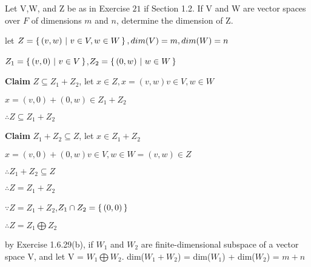 Let V,W, and Z be as in Exercise $21$ if Section 1.2. If V and W are vector spaces over $F$ of dimensions $m$ and $n$, determine the dimension of Z.

\begin{tcolorbox}
	\begin{solution}
		let $Z = \left\{ \,(v,w) ~|~ v \in V,w \in W \,\right\}, dim(V)=m,dim(W)=n$
		
		$Z_1 = \left\{ \,(v,0) ~|~ v \in V \,\right\}$,$Z_2 = \left\{ \,(0,w) ~|~ w \in W \,\right\}$
		
		\textbf{Claim} $Z \subseteq Z_1 + Z_2$, let $x \in Z, x = (v,w) v\in V,w \in W$
		
		$x = (v,0) + (0,w) \in Z_1 + Z_2$
		
		$\therefore Z \subseteq Z_1 + Z_2$
		
		\textbf{Claim} $Z_1 + Z_2 \subseteq Z$, let $x \in Z_1 + Z_2$
		
		$x = (v,0) + (0,w) v\in V, w \in W = (v,w) \in Z$
		
		$\therefore Z_1 + Z_2 \subseteq Z$
		
		$\therefore Z = Z_1 + Z_2$
		
		$\because Z = Z_1 + Z_2$,$Z_1 \cap Z_2 = \left\{ \,(0,0) \,\right\}$
		
		$\therefore Z = Z_1 \bigoplus Z_2$
		
		by Exercise 1.6.29(b), if $W_1$ and $W_2$ are finite-dimensional subspace of a vector space V, and let V = $W_1 \bigoplus W_2$. dim($W_1+W_2$) = dim($W_1$) + dim($W_2$) = $m+n$
			
	\end{solution}
\end{tcolorbox}